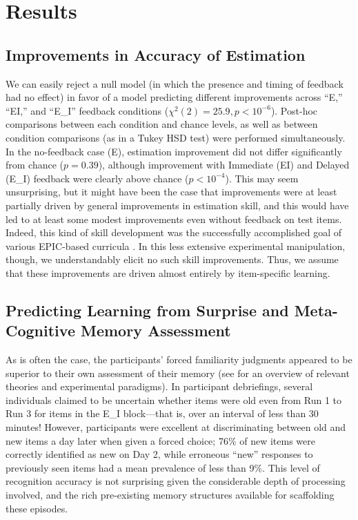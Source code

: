 \section{Results}

\subsection{Improvements in Accuracy of Estimation}

We can easily reject a null model (in which the presence and timing of feedback
had no effect) in favor of a model predicting different improvements across
``E,'' ``EI,'' and ``E\_I'' feedback conditions ($\chi^2(2) = 25.9, p <
10^{-6}$). Post-hoc comparisons between each condition and chance levels, as
well as between condition comparisons (as in a Tukey HSD test) were performed
simultaneously. 
In the no-feedback case (E), estimation improvement did not differ significantly
from chance ($p = 0.39$), although improvement with Immediate (EI) and Delayed
(E\_I) feedback were clearly above chance ($p < 10^{-4}$). This may seem
unsurprising, but it might have been the case that improvements were at least
partially driven by general improvements in estimation skill, and this would
have led to at least some modest improvements even without feedback on test
items. Indeed, this kind of skill development was the successfully accomplished
goal of various EPIC-based curricula
\parencite[e.g.,][]{munnich_numerically-driven_2004,ranney_designing_2008}. In
this less extensive experimental manipulation, though, we understandably elicit
no such skill improvements. Thus, we assume that these improvements are driven
almost entirely by item-specific learning.

\subsection{Predicting Learning from Surprise and Meta-Cognitive Memory
Assessment}

As is often the case, the participants' forced familiarity judgments appeared to
be superior to their own assessment of their memory (see
 for an overview of relevant theories and
experimental paradigms).  In participant debriefings, several individuals
claimed to be uncertain whether items were old even from Run 1 to Run 3 for
items in the E\_I block––that is, over an interval of less than 30 minutes!
However, participants were excellent at discriminating between old and new items
a day later when given a forced choice; 76\% of new items were correctly
identified as new on Day 2, while erroneous “new” responses to previously seen
items had a mean prevalence of less than 9\%. This level of recognition accuracy
is not surprising given the considerable depth of processing involved, and the
rich pre-existing memory structures available for scaffolding these episodes.

